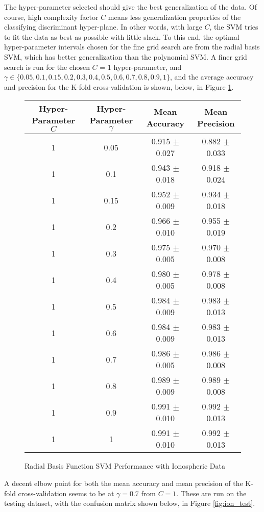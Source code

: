 \documentclass[tikz]{article}
\begin{document}
The hyper-parameter selected should give the best generalization of the data. Of course, high complexity factor $C$ means less generalization properties of the classifying discriminant hyper-plane. In other words, with large $C$, the SVM tries to fit the data as best as possible with little slack. To this end, the optimal hyper-parameter intervals chosen for the fine grid search are from the radial basis SVM, which has better generalization than the polynomial SVM. A finer grid search is run for the chosen $C$ = 1 hyper-parameter, and $\gamma \in \{0.05, 0.1, 0.15, 0.2, 0.3, 0.4, 0.5, 0.6, 0.7, 0.8, 0.9, 1\}$, and the average accuracy and precision for the K-fold cross-validation is shown, below, in Figure \ref{fig:ion_rbf_2}.
\begin{figure}[H]
\centering
\begin{tabular}{|c|c|c|c|}
\hline
Hyper-Parameter $C$ & Hyper-Parameter $\gamma$ & Mean Accuracy & Mean Precision \\
\hline
1 & 0.05 & 0.915 $\pm$ 0.027 & 0.882 $\pm$ 0.033 \\
\hline
1 & 0.1 & 0.943 $\pm$ 0.018 & 0.918 $\pm$ 0.024 \\
\hline
1 & 0.15 & 0.952 $\pm$ 0.009 & 0.934 $\pm$ 0.018 \\
\hline
1 & 0.2 & 0.966 $\pm$ 0.010 & 0.955 $\pm$ 0.019 \\
\hline
1 & 0.3 & 0.975 $\pm$ 0.005 & 0.970 $\pm$ 0.008 \\
\hline
1 & 0.4 & 0.980 $\pm$ 0.005 & 0.978 $\pm$ 0.008 \\
\hline
1 & 0.5 & 0.984 $\pm$ 0.009 & 0.983 $\pm$ 0.013 \\
\hline
1 & 0.6 & 0.984 $\pm$ 0.009 & 0.983 $\pm$ 0.013 \\
\hline
1 & 0.7 & 0.986 $\pm$ 0.005 & 0.986 $\pm$ 0.008 \\
\hline
1 & 0.8 & 0.989 $\pm$ 0.009 & 0.989 $\pm$ 0.008 \\
\hline
1 & 0.9 & 0.991 $\pm$ 0.010 & 0.992 $\pm$ 0.013 \\
\hline
1 & 1 & 0.991 $\pm$ 0.010 & 0.992 $\pm$ 0.013 \\
\hline
\end{tabular}
\caption{Radial Basis Function SVM Performance with Ionospheric Data}
\label{fig:ion_rbf_2}
\end{figure}
A decent elbow point for both the mean accuracy and mean precision of the K-fold cross-validation seems to be at $\gamma = 0.7$ from $C = 1$. These are run on the testing dataset, with the confusion matrix shown below, in Figure \ref{fig:ion_test}.
\end{document}
